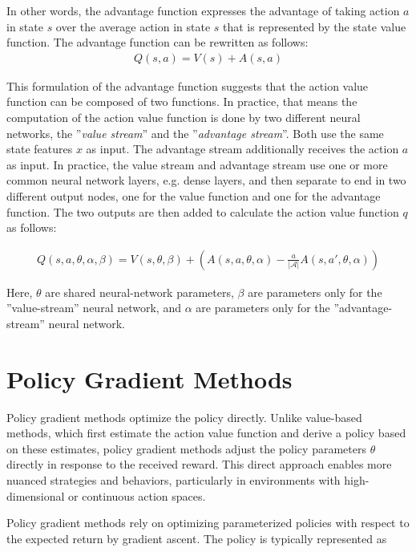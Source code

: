 In other words, the advantage function expresses the advantage of taking action $a$ in state $s$ over the average action in state $s$ that is represented by the state value function. The advantage function can be rewritten as follows:
\begin{align*}
Q(s, a) = V(s) + A(s, a)
\end{align*}

This formulation of the advantage function suggests that the action value function can be composed of two functions. In practice, that means the computation of the action value function is done by two different neural networks, the ''\emph{value stream}'' and the ''\emph{advantage stream}''. Both use the same state features $x$ as input. The advantage stream additionally receives the action $a$ as input. In practice, the value stream and advantage stream use one or more common neural network layers, e.g. dense layers, and then separate to end in two different output nodes, one for the value function and one for the advantage function. The two outputs are then added to calculate the action value function $q$ as follows:

\begin{align*}
Q(s, a, \theta, \alpha, \beta) = V(s, \theta, \beta) + \left( A(s, a, \theta, \alpha) - \frac{a}{|\mathcal{A}|} A(s, a', \theta, \alpha) \right)
\end{align*}

Here, $\theta$ are shared neural-network parameters, $\beta$ are parameters only for the ''value-stream'' neural network, and $\alpha$ are parameters only for the ''advantage-stream'' neural network.

\section{Policy Gradient Methods}

Policy gradient methods optimize the policy directly. Unlike value-based methods, which first estimate the action value function and derive a policy based on these estimates, policy gradient methods adjust the policy parameters $\theta$ directly in response to the received reward. This direct approach enables more nuanced strategies and behaviors, particularly in environments with high-dimensional or continuous action spaces.

Policy gradient methods rely on optimizing parameterized policies with respect to the expected return by gradient ascent. The policy is typically represented as 

